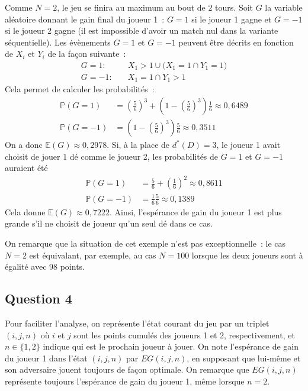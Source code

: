 \documentclass[a4paper,11pt]{amsart}
\theoremstyle{plain}
\begin{document}
Comme $N = 2$, le jeu se finira au maximum au bout de $2$ tours. Soit $G$ la variable aléatoire donnant le gain final du joueur 1~: $G = 1$ si le joueur 1 gagne et $G = -1$ si le joueur 2 gagne (il est impossible d'avoir un match nul dans la variante séquentielle). Les évènements $G = 1$ et $G = -1$ peuvent être décrits en fonction de $X_i$ et $Y_i$ de la façon suivante~:
\begin{align*}
G = 1 : \quad & X_1 > 1 \cup \bigl(X_1 = 1 \cap Y_1 = 1\bigr) \\
G = -1 : \quad & X_1 = 1 \cap Y_1 > 1
\end{align*}
Cela permet de calculer les probabilités~:
\begin{align*}
\mathbb P(G = 1) & = \left(\frac{5}{6}\right)^3 + \left(1 - \left(\frac{5}{6}\right)^3\right)\frac{1}{6} \approx 0,6489\\
\mathbb P(G = -1) & = \left(1 - \left(\frac{5}{6}\right)^3\right) \frac{5}{6} \approx 0,3511
\end{align*}
On a donc $\mathbb E(G) \approx 0,2978$. Si, à la place de $d^\ast(D) = 3$, le joueur 1 avait choisit de jouer $1$ dé comme le joueur 2, les probabilités de $G = 1$ et $G = -1$ auraient été
\begin{align*}
\mathbb P(G = 1) & = \frac{5}{6} + \left(\frac{1}{6}\right)^2 \approx 0,8611\\
\mathbb P(G = -1) & = \frac{1}{6} \frac{5}{6} \approx 0,1389
\end{align*}
Cela donne $\mathbb E(G) \approx 0,7222$. Ainsi, l'espérance de gain du joueur 1 est plus grande s'il ne choisit de joueur qu'un seul dé dans ce cas.

On remarque que la situation de cet exemple n'est pas exceptionnelle~: le cas $N = 2$ est équivalant, par exemple, au cas $N = 100$ lorsque les deux joueurs sont à égalité avec $98$ points.

\subsection{Question 4}

Pour faciliter l'analyse, on représente l'état courant du jeu par un triplet $(i, j, n)$ où $i$ et $j$ sont les points cumulés des joueurs 1 et 2, respectivement, et $n \in \{1, 2\}$ indique qui est le prochain joueur à jouer. On note l'espérance de gain du joueur 1 dans l'état $(i, j, n)$ par $EG(i, j, n)$, en supposant que lui-même et son adversaire jouent toujours de façon optimale. On remarque que $EG(i, j, n)$ représente toujours l'espérance de gain du joueur 1, même lorsque $n = 2$.
\end{document}
